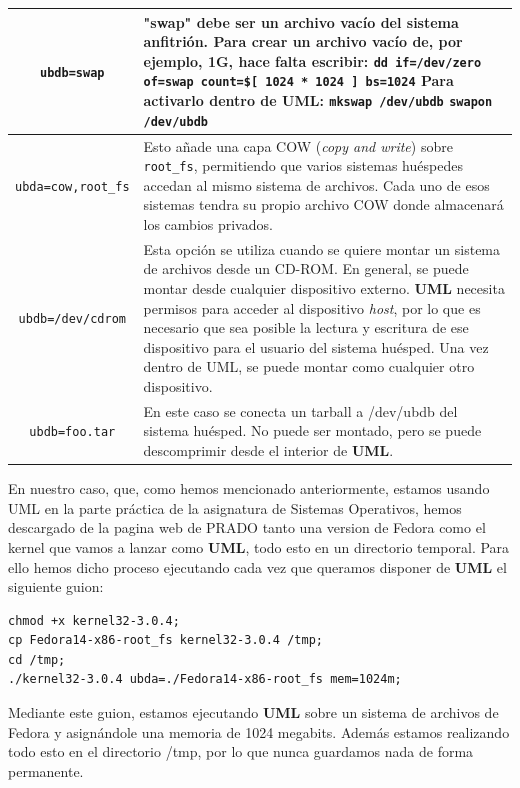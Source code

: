 \documentclass[11pt,twoside,titlepage,a4paper]{article}
\theoremstyle{definition}
\theoremstyle{plain_rojo}
\theoremstyle{remark}
\begin{document}
\begin{center}
\begin{tabular}{|c|p{11.5cm}|}
\hline
\texttt{ubdb=swap}
&
\parbox[t]{11.5cm}{"swap" debe ser un archivo vacío del sistema anfitrión. Para crear un archivo vacío de, por ejemplo, 1G, hace falta escribir:}
\parbox[c]{11.5cm}{\texttt{dd if=/dev/zero of=swap count=\$[ 1024 * 1024 ] bs=1024}}
\parbox[t]{11.5cm}{Para activarlo dentro de \textbf{UML}:}
\parbox[c]{11.5cm}{\texttt{mkswap /dev/ubdb}}
\parbox[c]{11.5cm}{\texttt{swapon /dev/ubdb}}
\\
\hline
\texttt{ubda=cow,root\_fs}
& Esto añade una capa COW (\textit{copy and write}) sobre \texttt{root\_fs},
permitiendo que varios sistemas huéspedes accedan al mismo sistema de 
archivos. Cada uno de esos sistemas tendra su propio archivo COW donde 
almacenará los cambios privados.
\\
\hline
\texttt{ubdb=/dev/cdrom}
& Esta opción se utiliza cuando se quiere montar un sistema de archivos desde
un CD-ROM. En general, se puede montar desde cualquier dispositivo externo.
\textbf{UML} necesita permisos para acceder al dispositivo \textit{host}, por
lo que es necesario que sea posible la lectura y escritura de ese dispositivo
para el usuario del sistema huésped. Una vez dentro de UML, se puede montar
como cualquier otro dispositivo.
\\
\hline
\texttt{ubdb=foo.tar}
& En este caso se conecta un tarball a /dev/ubdb del sistema huésped. No puede
ser montado, pero se puede descomprimir desde el interior de \textbf{UML}.
\\
\hline
\end{tabular}
\end{center}
\bigskip
En nuestro caso, que, como hemos mencionado anteriormente, estamos usando UML 
en la parte práctica de la asignatura de Sistemas Operativos, hemos 
descargado de la pagina web de PRADO tanto una version de Fedora como el 
kernel que vamos a lanzar como \textbf{UML}, todo esto en un directorio 
temporal. Para ello hemos dicho proceso ejecutando cada vez que queramos 
disponer de \textbf{UML} el siguiente guion:
\begin{lstlisting}
chmod +x kernel32-3.0.4;
cp Fedora14-x86-root_fs kernel32-3.0.4 /tmp;
cd /tmp;
./kernel32-3.0.4 ubda=./Fedora14-x86-root_fs mem=1024m;
\end{lstlisting}
Mediante este guion, estamos ejecutando \textbf{UML} sobre un sistema de
archivos de Fedora y asignándole una memoria de 1024 megabits. Además estamos
realizando todo esto en el directorio /tmp, por lo que nunca guardamos nada
de forma permanente.
\end{document}
